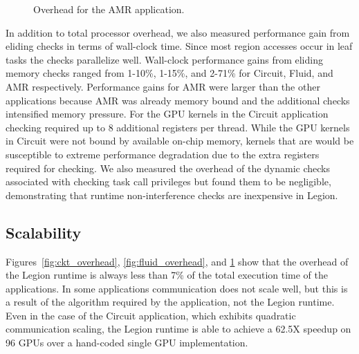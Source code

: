 \begin{figure}
\begin{center}
{\label{fig:amr16384}
}
\end{center}
\vspace{-2mm}
\caption{Overhead for the AMR application.\label{fig:amr_overhead}}
\vspace{-6mm}
\end{figure}

In addition to total processor overhead, we also measured performance gain from eliding checks in 
terms of wall-clock time.  Since most region accesses occur in leaf tasks the checks parallelize 
well.  Wall-clock performance gains from eliding memory checks ranged from 1-10\%, 1-15\%, 
and 2-71\% for Circuit, Fluid, and AMR respectively.  Performance gains for AMR were larger than
the other applications because AMR was already memory bound and the additional checks intensified
memory pressure.  For the GPU kernels in the Circuit application checking required up to 8 additional 
registers per thread.  While the GPU kernels in Circuit were not bound by 
available on-chip memory, kernels that are would be susceptible to extreme performance 
degradation due to the extra registers required for checking.  We also measured the overhead
of the dynamic checks associated with checking task call privileges but found them to be negligible,
demonstrating that runtime non-interference checks are inexpensive in Legion.

\subsection{Scalability}
\label{subsec:scalability}

Figures~\ref{fig:ckt_overhead}, \ref{fig:fluid_overhead}, and \ref{fig:amr_overhead} show that
the overhead of the Legion runtime is always less than 7\% of the total execution time
of the applications.  In some applications communication does not scale well, but this is
a result of the algorithm required by the application, not the Legion runtime.
Even in the case of the Circuit application, which exhibits quadratic communication scaling, the Legion
runtime is able to achieve a 62.5X speedup on 96 GPUs over a hand-coded single GPU implementation\cite{Legion12}.

